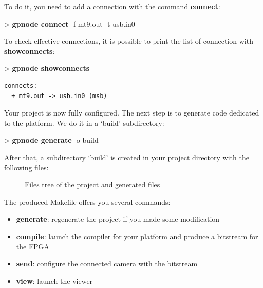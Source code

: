 \documentclass[10pt,a4paper]{article}
\begin{document}
To do it, you need to add a connection with the command \textbf{connect}:
\begin{sample}
> \textbf{gpnode connect} -f mt9.out -t usb.in0
\end{sample}

To check effective connections, it is possible to print the list of connection with \textbf{showconnects}:
\begin{sample}
> \textbf{gpnode showconnects}
\begin{Verbatim}
connects:
  + mt9.out -> usb.in0 (msb)
\end{Verbatim}
\end{sample}

Your project is now fully configured. The next step is to generate code dedicated to the platform. We do it in a `build' subdirectory:

\begin{sample}
> \textbf{gpnode generate} -o build
\end{sample}

After that, a subdirectory `build' is created in your project directory with the following files:

\begin{figure}[h]
\caption{Files tree of the project and generated files}
\label{fig:archivetree}
\end{figure}

The produced Makefile offers you several commands:
\begin{itemize}
\item \textbf{generate}: regenerate the project if you made some modification
\item \textbf{compile}: launch the compiler for your platform and produce a bitstream for the FPGA
\item \textbf{send}: configure the connected camera with the bitstream
\item \textbf{view}: launch the viewer
\end{itemize}
\end{document}
